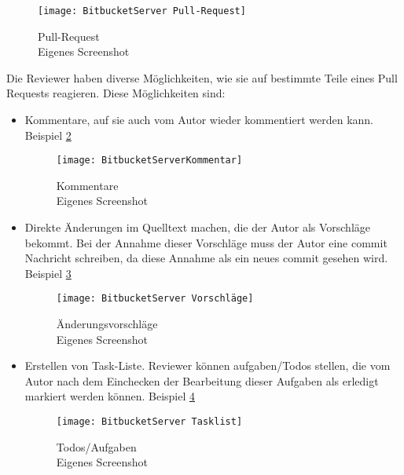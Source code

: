 \begin{figure}[H]
	\centering
	\texttt{[image: BitbucketServer Pull-Request]}
	\caption[Pull-Request auf Bitbucket-Server]{Pull-Request\\Eigenes Screenshot}
	\label{fig:BitbucketServer Pull-Request}
\end{figure}

Die Reviewer haben diverse Möglichkeiten, wie sie auf bestimmte Teile eines Pull Requests reagieren. Diese Möglichkeiten sind:
\begin{itemize}
	\item Kommentare, auf sie auch vom Autor wieder kommentiert werden kann. Beispiel \cref{fig:BitbucketServerKommentar}
	\begin{figure}[H]
		\centering
		\texttt{[image: BitbucketServerKommentar]}
		\caption[Bitbucket-Server Kommentare]{Kommentare\\Eigenes Screenshot}
		\label{fig:BitbucketServerKommentar}
	\end{figure}
	
	\item Direkte Änderungen im Quelltext machen, die der Autor als Vorschläge bekommt. Bei der Annahme dieser Vorschläge muss der Autor eine commit Nachricht schreiben, da diese 				Annahme als ein neues commit gesehen wird. Beispiel \cref{fig:BitbucketServer Vorschläge}
	\begin{figure}[H]
		\centering
		\texttt{[image: BitbucketServer Vorschläge]}
		\caption[Bitbucket-Server Änderungsvorschläge]{Änderungsvorschläge\\Eigenes Screenshot}
		\label{fig:BitbucketServer Vorschläge}
	\end{figure}
	
	
	\item Erstellen von Task-Liste. Reviewer können aufgaben/Todos stellen, die vom Autor nach dem Einchecken der Bearbeitung dieser Aufgaben als erledigt markiert werden können. Beispiel 	\cref{fig:BitbucketServer Tasklist}
	\begin{figure}[H]
		\centering
		\texttt{[image: BitbucketServer Tasklist]}
		\caption[Bitbucket-Server Todos]{Todos/Aufgaben\\Eigenes Screenshot}
		\label{fig:BitbucketServer Tasklist}
	\end{figure}
\end{itemize}


